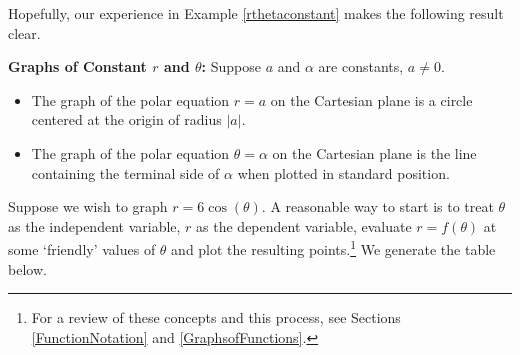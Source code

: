 Hopefully, our experience in Example \ref{rthetaconstant} makes the following result clear.

\smallskip

\colorbox{ResultColor}{\bbm

\begin{thm} \label{graphsofconstantrtheta}  \textbf{Graphs of Constant $r$ and $\theta$:} Suppose $a$ and $\alpha$ are constants, $a \neq 0$. 

\begin{itemize}

\item The graph of the polar equation $r = a$ on the Cartesian plane is a circle centered at the origin of radius $|a|$.



\item The graph of the polar equation $\theta = \alpha$ on the Cartesian plane is the line containing the terminal side of $\alpha$ when plotted in standard position.


\end{itemize}



\end{thm}

\ebm}

\smallskip

Suppose we wish to graph $r = 6\cos(\theta)$.  A reasonable way to start is to treat $\theta$ as the independent variable, $r$ as the dependent variable,  evaluate $r = f(\theta)$ at some `friendly' values of $\theta$ and plot the resulting points.\footnote{For a review of these concepts and this process, see Sections \ref{FunctionNotation} and \ref{GraphsofFunctions}.}  We generate the table below.


